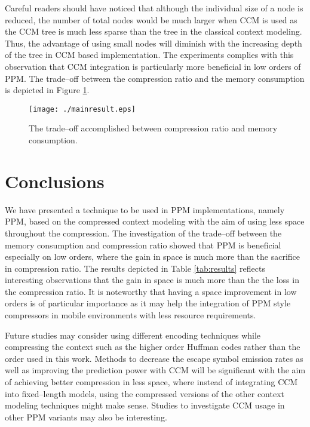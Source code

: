 \documentclass[runningheads,a4paper]{llncs}
\begin{document}
Careful readers should have noticed  that although the individual size of a node is reduced, the number of total nodes
would be much larger when CCM is used as the CCM tree is much less sparse than the tree in the classical context
modeling.  
Thus, the advantage of using small nodes will diminish with the increasing depth of the tree in CCM based
implementation. The experiments complies with this observation that CCM integration is particularly more beneficial in
low orders of PPM. The trade--off between the compression ratio and the memory consumption is depicted in Figure
\ref{fig:mainresult}.

\begin{figure}
 \begin{center}
 \texttt{[image: ./mainresult.eps]}
\end{center}
\caption{The trade--off accomplished between compression ratio and memory consumption.}
\label{fig:mainresult}
\end{figure} 
 
\section{Conclusions}

We have presented a technique to be used in PPM implementations, namely PPM, based on the
compressed context modeling with the aim of using less space throughout the compression. 
The investigation of the trade--off between the memory consumption and  compression ratio showed that PPM is
beneficial especially on low orders, where the gain in space is much more than the sacrifice in compression ratio. The
results depicted in Table \ref{tab:results} reflects interesting observations that the gain in space is much more than
the the loss in the compression ratio. 
It is noteworthy that having a space improvement in low orders is of particular importance as it may help 
the integration of PPM style compressors in mobile environments with less resource requirements. 

Future studies may consider using different encoding techniques while compressing the context such as the higher
order Huffman codes rather than the  order used in this work. 
Methods to decrease the escape symbol emission rates as well as improving the prediction power with CCM will be
significant with the aim of achieving better compression in less space, where instead of integrating CCM into 
fixed--length models, using the compressed versions of the other context modeling techniques might make sense. 
Studies to investigate CCM usage in other PPM variants may also be interesting. 





\end{document}
